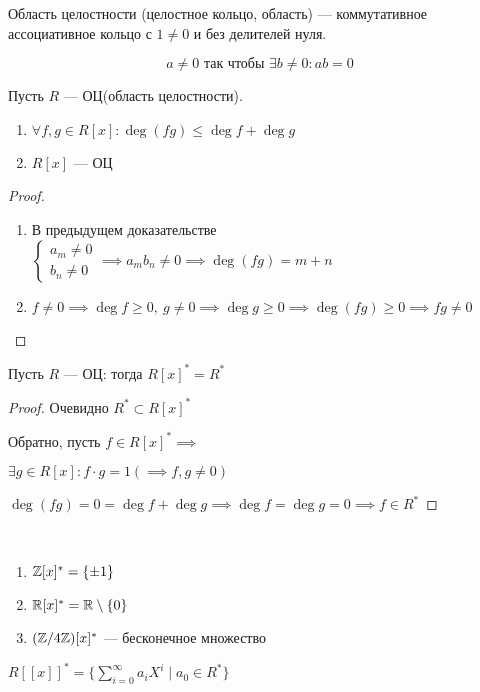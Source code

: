 \begin{defn}
    Область целостности (целостное кольцо, область) --- коммутативное ассоциативное кольцо с $1 \neq 0$ и без делителей нуля.

    \[ a \neq 0 \text{ так чтобы } \exists b \neq 0 : ab = 0 \]
\end{defn}

\begin{theorem-non}
    Пусть $R$ --- ОЦ(область целостности). 

    \begin{enumerate}
        \item $\forall f,g \in R[x]: \deg(fg) \leq \deg f + \deg g$
        
        \item $R[x]$ --- ОЦ
    \end{enumerate}
\end{theorem-non}

\begin{proof}
    \begin{enumerate}
        \item В предыдущем доказательстве $\begin{cases}
            a_m \neq 0\\
            b_n \neq 0
        \end{cases} \implies a_m b_n \neq 0 \implies \deg(fg) = m + n$

        \item $f \neq 0 \implies \deg f \geq 0,~g \neq 0 \implies \deg g \geq 0 \implies \deg(fg) \geq 0 \implies fg \neq 0$
    \end{enumerate}
\end{proof}

\begin{follow}
    Пусть $R$ --- ОЦ: тогда $R[x]^* = R^*$
\end{follow}

\begin{proof}
    Очевидно $R^* \subset R[x]^*$

    Обратно, пусть $f \in R[x]^* \implies$

    $\exists g \in R[x]: f \cdot g = 1 (\implies f, g \neq 0)$

    $\deg(fg) = 0 = \deg f + \deg g \implies \deg f = \deg g = 0 \implies f  \in R^*$
\end{proof}

\begin{examples}~

    \begin{enumerate}
        \item $\mathbb{Z}[x]^* = \{\pm 1\}$
        
        \item $\mathbb{R}[x]^* = \mathbb{R} \setminus \{0\}$
    
        \item $(\mathbb{Z}/4\mathbb{Z})[x]^*$ --- бесконечное множество
    \end{enumerate}
\end{examples}

\begin{exerc}
    $R[[x]]^* = \{ \sum\limits_{i = 0}^{\infty} a_iX^i \mid a_0 \in R^* \}$    
\end{exerc}
